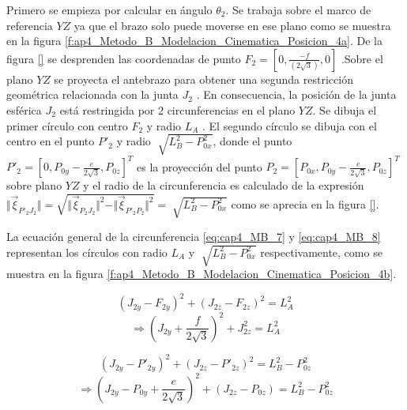       Primero se empieza por calcular en ángulo $\theta_2$. Se trabaja sobre el marco de referencia $YZ$ ya que el brazo   solo puede moverse en ese plano como se muestra en la figura \ref{f:ap4_Metodo_B_Modelacion_Cinematica_Posicion_4a}. De la figura \ref{} se desprenden las coordenadas de punto $F_2=\left[0,\frac{-f}{(2\sqrt{3})},0\right]$ .Sobre el plano $ YZ $ se proyecta el antebrazo para obtener una segunda restricción geométrica relacionada con la junta  \( J_{2} \) . En consecuencia, la posición de la junta esférica  \( J_{2} \)  está restringida por 2 circunferencias en el plano $YZ$. Se dibuja el primer círculo con centro  \( F_{2} \)  y radio  \( L_{A} \) . El segundo círculo se dibuja con el centro en el punto  \( P'_{2} \)  y radio  \( \sqrt[]{L_{B}^{2}-P_{0x}^{2}} \), donde el punto $P'_{2}=\left[0,P_{0y}-\frac{e}{2\sqrt{3}},P_{0z}\right]^T$ es la proyección del punto $P_{2}=\left[P_{0x},P_{0y}-\frac{e}{2\sqrt{3}},P_{0z}\right]^T$ sobre plano $YZ$ y el radio de la circunferencia es calculado de la expresión  $\Vert \overrightarrow{\xi}_{P'_2J_2} \Vert = \sqrt{\Vert \overrightarrow{\xi}_{P_2J_2}\Vert^2-\Vert \overrightarrow{\xi}_{P'_2P_2}\Vert^2 }=\sqrt[]{L_{B}^{2}-P_{0x}^{2}}$       como se aprecia en la figura \ref{}.
      
     \newpage


      La ecuación general de la circunferencia \ref{eq:cap4_MB_7} y \ref{eq:cap4_MB_8} representan los círculos con radio  \( L_{A} \)  y  \( \sqrt[]{L_{B}^{2}-P_{0x}^{2}} \)  respectivamente, como se muestra en la figura \ref{f:ap4_Metodo_B_Modelacion_Cinematica_Posicion_4b}.
  
  
        \begin{equation*}
              (J_{2y}-F_{2y})^2 + (J_{2z}-F_{2z})^2=  L_{A}^{2}
        \end{equation*}
        \begin{equation}
              \Rightarrow  \left (J_{2y} + \frac{f}{2\sqrt{3}}\right)^2 + J_{2z}^{2}= L_{A}^{2}
        \label{eq:cap4_MB_7}
        \end{equation}     

        \begin{equation*}
              (J_{2y}-{P'}_{2y})^2 + (J_{2z}-{P'}_{2z})^2= L_{B}^{2} -P_{0z}^2 
        \end{equation*}          
        \begin{equation}
             \Rightarrow   \left (J_{2y} - P_{0y}+ \frac{e}{2\sqrt{3}}\right)^2 + ({J}_{2z}-{P}_{0z}) = L_{B}^{2} -P_{0z}^2
        \label{eq:cap4_MB_8}
        \end{equation}  
    
